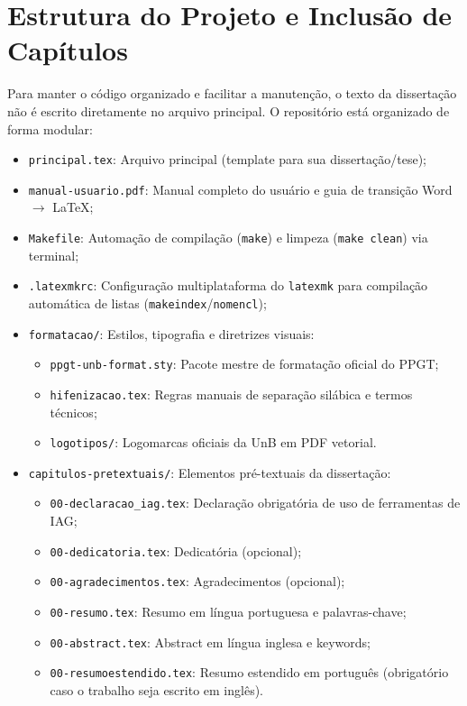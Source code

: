 \documentclass[12pt, a4paper]{article}
\begin{document}
\section{Estrutura do Projeto e Inclusão de Capítulos}

Para manter o código organizado e facilitar a manutenção, o texto da dissertação não é escrito diretamente no arquivo principal. O repositório está organizado de forma modular:

\begin{itemize}
    \item \texttt{principal.tex}: Arquivo principal (template para sua dissertação/tese);
    \item \texttt{manual-usuario.pdf}: Manual completo do usuário e guia de transição Word $\rightarrow$ \LaTeX;
    \item \texttt{Makefile}: Automação de compilação (\texttt{make}) e limpeza (\texttt{make clean}) via terminal;
    \item \texttt{.latexmkrc}: Configuração multiplataforma do \texttt{latexmk} para compilação automática de listas (\texttt{makeindex}/\texttt{nomencl});
    \item \texttt{formatacao/}: Estilos, tipografia e diretrizes visuais:
    \begin{itemize}
        \item \texttt{ppgt-unb-format.sty}: Pacote mestre de formatação oficial do PPGT;
        \item \texttt{hifenizacao.tex}: Regras manuais de separação silábica e termos técnicos;
        \item \texttt{logotipos/}: Logomarcas oficiais da UnB em PDF vetorial.
    \end{itemize}
    \item \texttt{capitulos-pretextuais/}: Elementos pré-textuais da dissertação:
    \begin{itemize}
        \item \texttt{00-declaracao\_iag.tex}: Declaração obrigatória de uso de ferramentas de IAG;
        \item \texttt{00-dedicatoria.tex}: Dedicatória (opcional);
        \item \texttt{00-agradecimentos.tex}: Agradecimentos (opcional);
        \item \texttt{00-resumo.tex}: Resumo em língua portuguesa e palavras-chave;
        \item \texttt{00-abstract.tex}: Abstract em língua inglesa e keywords;
        \item \texttt{00-resumoestendido.tex}: Resumo estendido em português (obrigatório caso o trabalho seja escrito em inglês).

\end{itemize}
\end{itemize}
\end{document}
